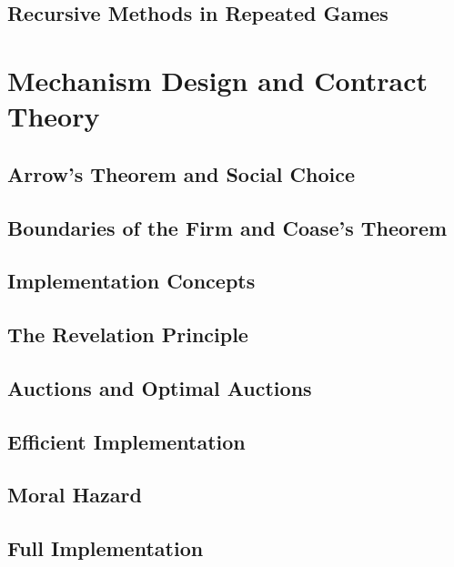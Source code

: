 \documentclass[12pt,openany]{report}
\theoremstyle{definition}
\begin{document}
\chapter{Recursive Methods in Repeated Games}

\part{Mechanism Design and Contract Theory}

\chapter{Arrow's Theorem and Social Choice}

\chapter{Boundaries of the Firm and Coase's Theorem}

\chapter{Implementation Concepts}

\chapter{The Revelation Principle}

\chapter{Auctions and Optimal Auctions}

\chapter{Efficient Implementation}

\chapter{Moral Hazard}

\chapter{Full Implementation}

\newpage


\end{document}
